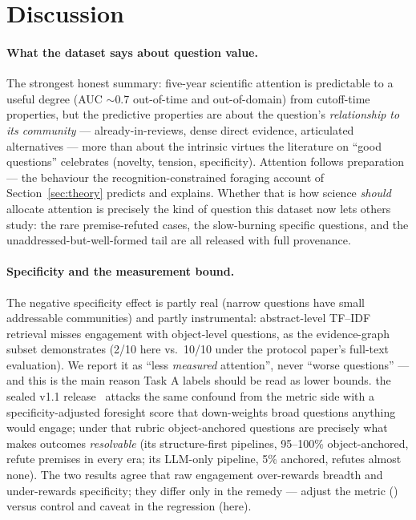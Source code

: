 \documentclass[11pt]{article}
\begin{document}
\section{Discussion}
\label{sec:discussion}

\paragraph{What the dataset says about question value.} The strongest
honest summary: five-year scientific attention is predictable to a
useful degree (AUC $\sim$0.7 out-of-time and out-of-domain) from
cutoff-time properties, but the predictive properties are about the
question's \emph{relationship to its community} --- already-in-reviews,
dense direct evidence, articulated alternatives --- more than about the
intrinsic virtues the literature on ``good questions'' celebrates
(novelty, tension, specificity). Attention follows preparation ---
the behaviour the recognition-constrained foraging account of
Section~\ref{sec:theory} predicts and explains. Whether
that is how science \emph{should} allocate attention is precisely the
kind of question this dataset now lets others study: the rare
premise-refuted cases, the slow-burning specific questions, and the
unaddressed-but-well-formed tail are all released with full provenance.

\paragraph{Specificity and the measurement bound.} The negative
specificity effect is partly real (narrow questions have small
addressable communities) and partly instrumental: abstract-level TF--IDF
retrieval misses engagement with object-level questions, as the evidence-graph
subset demonstrates (2/10 here vs.\ 10/10 under the protocol paper's full-text
evaluation). We report it as ``less \emph{measured} attention'', never
``worse questions'' --- and this is the main reason Task A labels should
be read as lower bounds. the sealed v1.1 release~\cite{paper2} attacks the same confound from
the metric side with a specificity-adjusted foresight score that
down-weights broad questions anything would engage; under that rubric
object-anchored questions are precisely what makes outcomes
\emph{resolvable} (its structure-first pipelines, 95--100\%
object-anchored, refute premises in every era; its LLM-only pipeline,
5\% anchored, refutes almost none). The two results agree that raw
engagement over-rewards breadth and under-rewards specificity; they
differ only in the remedy --- adjust the metric (\cite{paper2}) versus
control and caveat in the regression (here).
\end{document}
